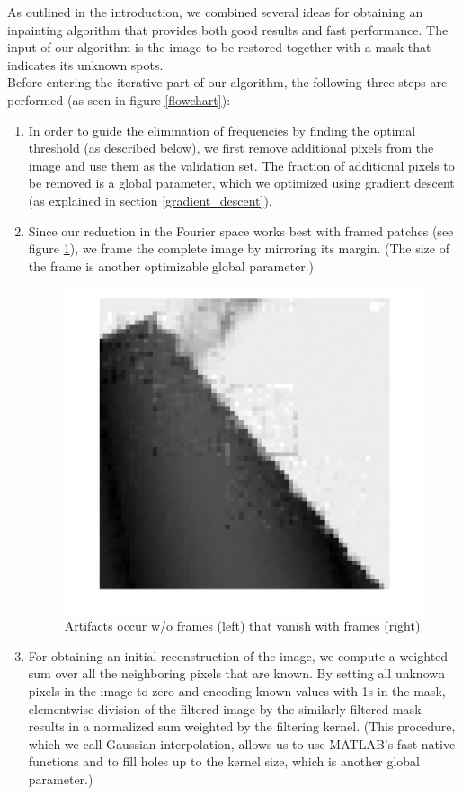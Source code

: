 \documentclass[10pt,conference,compsocconf]{IEEEtran}
\begin{document}
As outlined in the introduction, we combined several ideas for obtaining an inpainting algorithm that provides both good results and fast performance. The input of our algorithm is the image to be restored together with a mask that indicates its unknown spots.\\
Before entering the iterative part of our algorithm, the following three steps are performed (as seen in figure \ref{flowchart}):
\begin{enumerate}
\item In order to guide the elimination of frequencies by finding the optimal threshold (as described below), we first remove additional pixels from the image and use them as the validation set. The fraction of additional pixels to be removed is a global parameter, which we optimized using gradient descent (as explained in section \ref{gradient_descent}).
\item Since our reduction in the Fourier space works best with framed patches (see figure \ref{framing_artifacts}), we frame the complete image by mirroring its margin. (The size of the frame is another optimizable global parameter.)

\begin{figure}
\centering
\includegraphics[width=\columnwidth]{images/framing_artifacts.png}
\caption{Artifacts occur w/o frames (left) that vanish with frames (right).}
\label{framing_artifacts}
\end{figure}

\item For obtaining an initial reconstruction of the image, we compute a weighted sum over all the neighboring pixels that are known. By setting all unknown pixels in the image to zero and encoding known values with 1s in the mask, elementwise division of the filtered image by the similarly filtered mask results in a normalized sum weighted by the filtering kernel. (This procedure, which we call Gaussian interpolation, allows us to use MATLAB's fast native functions and to fill holes up to the kernel size, which is another global parameter.)
\label{gaussian_interpolation}
\end{enumerate}
\end{document}
